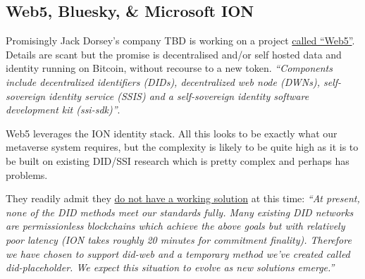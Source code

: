 \subsection{Web5, Bluesky, \& Microsoft ION}
Promisingly Jack Dorsey's company TBD is working on a project \href{https://developer.tbd.website/projects/web5/}{called ``Web5''}. Details are scant but the promise is decentralised and/or self hosted data and identity running on Bitcoin, without recourse to a new token. \textit{``Components include decentralized identifiers (DIDs), decentralized web node (DWNs), self-sovereign identity service (SSIS) and a self-sovereign identity software development kit (ssi-sdk)''}.\par
Web5 leverages the ION identity stack. All this looks to be exactly what our metaverse system requires, but the complexity is likely to be quite high as it is to be built on existing DID/SSI research which is pretty complex and perhaps has problems.\par 
They readily admit they \href{https://atproto.com/guides/identity}{do not have a working solution} at this time: \textit{``At present, none of the DID methods meet our standards fully. Many existing DID networks are permissionless blockchains which achieve the above goals but with relatively poor latency (ION takes roughly 20 minutes for commitment finality). Therefore we have chosen to support did-web and a temporary method we've created called did-placeholder. We expect this situation to evolve as new solutions emerge.''}

